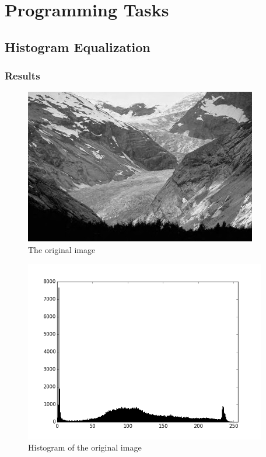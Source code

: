 \documentclass{article}
\begin{document}
\section{Programming Tasks}
\subsection{Histogram Equalization}
\subsubsection{Results}

\begin{figure}[H]
\centering
\includegraphics[width=288pt]{../img/02.png}
\caption{The original image}
\end{figure}

\begin{figure}[H]
\centering
\includegraphics[width=300pt]{../result/hist.png}
\caption{Histogram of the original image}
\end{figure}
\end{document}
